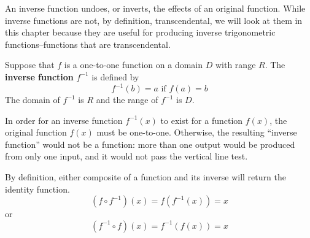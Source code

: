An inverse function undoes, or inverts, the effects of an original function.
While inverse functions are not, by definition, transcendental, we will look at them in this chapter because they are useful for producing inverse trigonometric functions--functions that are transcendental.
\begin{defn}
  Suppose that \(f\) is a one-to-one function on a domain $D$ with range $R$. The \textbf{inverse function} $f^{-1}$ is defined by
  \[ f^{-1}(b)=a \text{ if } f(a)=b \]
  The domain of $f^{-1}$ is $R$ and the range of $f^{-1}$ is $D$.
\end{defn}
In order for an inverse function $f^{-1}(x)$ to exist for a function $f(x)$, the original function $f(x)$ must be one-to-one. Otherwise, the resulting ``inverse function'' would not be a function: more than one output would be produced from only one input, and it would not pass the vertical line test.
\begin{remark} 
  By definition, either composite of a function and its inverse will return the identity function.
  \[ (f \circ f^{-1})(x)=f(f^{-1}(x))=x \]
  or
  \[ (f^{-1} \circ f)(x)=f^{-1}(f(x))=x \]
\end{remark}

\begin{figure}[H]
  \begin{center}
  \end{center}
  \label{fig:inversef}
\end{figure}

